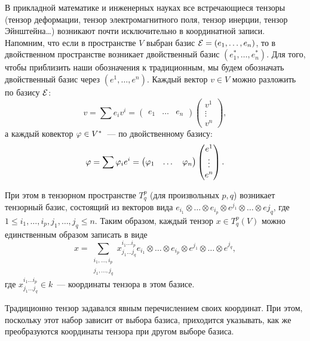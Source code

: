 В прикладной математике и инженерных науках все встречающиеся тензоры
(тензор деформации, тензор электромагнитного поля, тензор инерции,
тензор Эйнштейна\dots) возникают почти исключительно в координатной
записи.
Напомним, что если в пространстве $V$ выбран базис $\mathcal E=(e_1,\dots,e_n)$,
то в двойственном пространстве возникает двойственный базис
$(e_1^*,\dots,e_n^*)$. Для того, чтобы приблизить наши обозначения к
традиционным, мы будем обозначать двойственный базис через
$(e^1,\dots,e^n)$.
Каждый вектор $v\in V$ можно разложить по базису $\mathcal E$:
$$
v = \sum e_i v^i = \begin{pmatrix}e_1 & \dots & e_n\end{pmatrix}
\begin{pmatrix}v^1\\\vdots\\ v^n\end{pmatrix},
$$
а каждый ковектор $\varphi\in V^*$~--- по двойственному базису:
$$
\varphi = \sum \varphi_i e^i = \begin{pmatrix}\varphi_1 & \dots &
  \varphi_n\end{pmatrix}
\begin{pmatrix}e^1\\\vdots\\ e^n\end{pmatrix}.
$$

При этом в тензорном пространстве $T^p_q$ (для произвольных $p,q$)
возникает тензорный базис, состоящий из векторов вида
$e_{i_1}\otimes\dots\otimes e_{i_p}\otimes
e^{j_1}\otimes\dots\otimes e{j_q}$, где
$1\leq i_1,\dots,i_p,j_1,\dots,j_q\leq n$.
Таким образом, каждый тензор $x\in T^p_q(V)$ можно единственным
образом записать в виде
$$
x = \sum_{\substack{i_1,\dots,i_p \\ j_1,\dots,j_q}}
x^{i_1\dots i_p}_{j_1\dots j_q} e_{i_1}\otimes\dots\otimes
e_{i_p}\otimes e^{j_1}\otimes\dots\otimes e^{j_q},
$$
где $x^{i_1\dots i_p}_{j_1\dots j_q}\in k$~--- координаты тензора в
этом базисе.

Традиционно тензор задавался явным перечислением своих координат. При
этом, поскольку этот набор зависит от выбора базиса, приходится
указывать, как же преобразуются координаты тензора при другом выборе
базиса.

